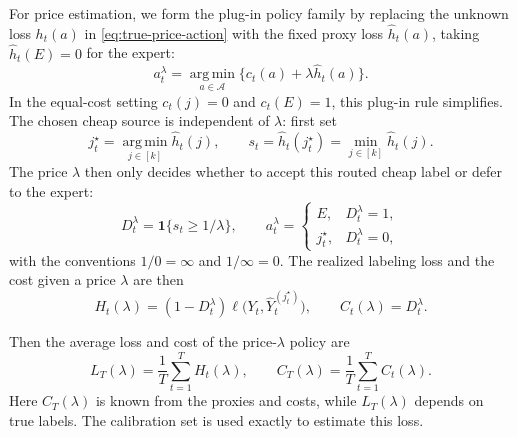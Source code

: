 \documentclass[11pt]{article}
\newcommand{\ind}[1]{\mathbf{1}\{#1\}}
\newcommand{\calA}{\mathcal{A}}
\newcommand{\hatY}{\widehat Y}
\newcommand{\hath}{\widehat h}
\newcommand{\argmin}{\operatorname*{arg\,min}}
\begin{document}
For price estimation, we form the plug-in policy family by replacing the
unknown loss \(h_t(a)\) in \eqref{eq:true-price-action} with the fixed proxy loss
\(\hath_t(a)\), taking \(\hath_t(E)=0\) for the expert:
\[
    a_t^\lambda
    =
    \argmin_{a\in\calA}
    \{c_t(a)+\lambda\hath_t(a)\}.
\]
In the equal-cost setting \(c_t(j)=0\) and \(c_t(E)=1\), this plug-in rule
simplifies. The chosen cheap
source is independent of \(\lambda\): first set
\begin{equation}
    j_t^\star
    =
    \argmin_{j\in[k]}\hath_{t}(j),
    \qquad
    s_t=\hath_t(j_t^\star)=\min_{j\in[k]}\hath_t(j).
    \label{eq:proxy-j-star}
\end{equation}
The price \(\lambda\) then only decides whether to accept this routed cheap
label or defer to the expert:
\begin{equation}
    D_t^\lambda
    =
    \ind{s_t\ge 1/\lambda},
    \qquad
    a_t^\lambda
    =
    \begin{cases}
        E, & D_t^\lambda=1,\\
        j_t^\star, & D_t^\lambda=0,
    \end{cases}
    \label{eq:proxy-action}
\end{equation}
with the conventions \(1/0=\infty\) and \(1/\infty=0\).
The realized labeling loss and the cost given a price $\lambda$ are then
\begin{equation}
    H_t(\lambda)
    =
    (1-D_t^\lambda)
    \ell\bigl(Y_t,\hatY_t^{(j_t^\star)}\bigr),\qquad 
    C_t(\lambda)
    =
    D_t^\lambda.
    \label{eq:H-C-lambda}
\end{equation}

Then the average loss and cost of the price-$\lambda$ policy are
\begin{equation}
    L_T(\lambda)=\frac1T\sum_{t=1}^T H_t(\lambda),
    \qquad
    C_T(\lambda)=\frac1T\sum_{t=1}^T C_t(\lambda).
    \label{eq:L-C-lambda}
\end{equation}
Here \(C_T(\lambda)\) is known from the proxies and costs, while
\(L_T(\lambda)\) depends on true labels. The calibration set is used exactly to
estimate this loss.
\end{document}
